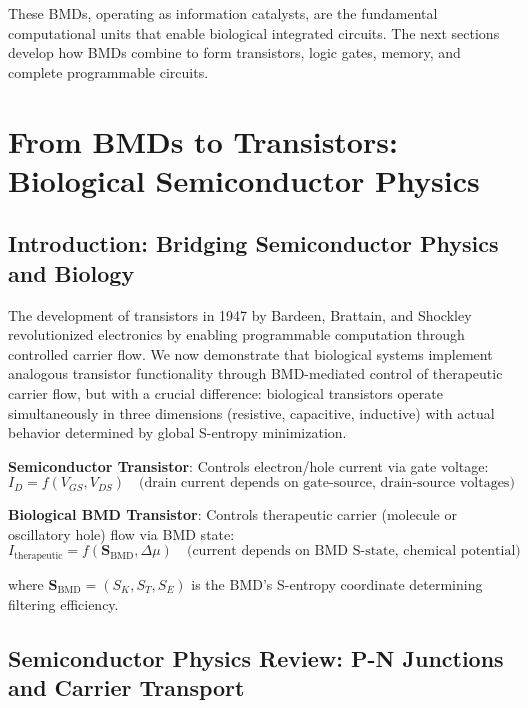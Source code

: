 \documentclass[11pt,a4paper]{article}
\begin{document}
These BMDs, operating as information catalysts, are the fundamental computational units that enable biological integrated circuits. The next sections develop how BMDs combine to form transistors, logic gates, memory, and complete programmable circuits.

\clearpage

\section{From BMDs to Transistors: Biological Semiconductor Physics}

\subsection{Introduction: Bridging Semiconductor Physics and Biology}

The development of transistors in 1947 by Bardeen, Brattain, and Shockley revolutionized electronics by enabling programmable computation through controlled carrier flow\cite{shockley1949theory,bardeen1950transistor}. We now demonstrate that biological systems implement analogous transistor functionality through BMD-mediated control of therapeutic carrier flow, but with a crucial difference: biological transistors operate simultaneously in three dimensions (resistive, capacitive, inductive) with actual behavior determined by global S-entropy minimization.

\textbf{Semiconductor Transistor}: Controls electron/hole current via gate voltage:
\begin{equation}
I_D = f(V_{GS}, V_{DS}) \quad \text{(drain current depends on gate-source, drain-source voltages)}
\end{equation}

\textbf{Biological BMD Transistor}: Controls therapeutic carrier (molecule or oscillatory hole) flow via BMD state:
\begin{equation}
I_{\text{therapeutic}} = f(\mathbf{S}_{\text{BMD}}, \Delta \mu) \quad \text{(current depends on BMD S-state, chemical potential)}
\end{equation}

where $\mathbf{S}_{\text{BMD}} = (S_K, S_T, S_E)$ is the BMD's S-entropy coordinate determining filtering efficiency.

\subsection{Semiconductor Physics Review: P-N Junctions and Carrier Transport}
\end{document}

